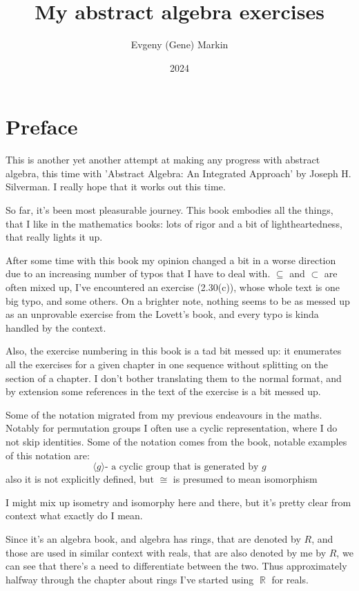 \documentclass[11pt,oneside,titlepage]{book}
\title{My abstract algebra exercises}
\author{Evgeny (Gene) Markin}
\date{2024}
\DeclareMathOperator \real {\mathbb {R}}
\newcommand{\eangle}[1]{\langle #1 \rangle}
\begin{document}
\maketitle
\tableofcontents

\chapter*{Preface}

This is another yet another attempt at making any progress with
abstract algebra, this time with 'Abstract Algebra: An Integrated
Approach' by Joseph H. Silverman. I really hope that it works out this
time.

So far, it's been most pleasurable journey. This book embodies all the
things, that I like in the mathematics books: lots of rigor and a bit of
lightheartedness, that really lights it up.

After some time with this book my opinion changed a bit in a worse
direction due to an increasing number of typos that I have to deal
with. $\subseteq$ and $\subset$ are often mixed up, I've encountered
an exercise (2.30(c)), whose whole text is one big typo, and some
others. On a brighter note, nothing seems to be as messed up as an
unprovable exercise from the Lovett's book, and every typo is kinda
handled by the context.

Also, the exercise numbering in this book is a tad bit messed up:
it enumerates all the exercises for a given chapter in one sequence
without splitting on the section of a chapter. I don't bother
translating them to the normal format, and by extension some references
in the text of the exercise is a bit messed up.

Some of the notation migrated from my previous endeavours in the
maths. Notably for permutation groups I often use a cyclic
representation, where I do not skip identities.
Some of the notation comes from the book, notable examples of
this notation are:
$$\eangle{g} \text{- a cyclic group that is generated by }g$$
also it is not explicitly defined, but $\cong$ is presumed to
mean isomorphism

I might mix up isometry and isomorphy here and there, but it's
pretty clear from context what exactly do I mean.

Since it's an algebra book, and algebra has rings, that are denoted by
$R$, and those are used in similar context with reals, that are also
denoted by me by $R$, we can see that there's a need to differentiate
between the two. Thus approximately halfway through the chapter about
rings I've started using $\real$ for reals.
\end{document}
